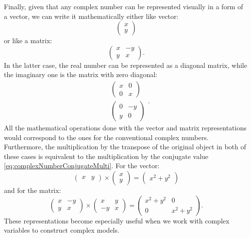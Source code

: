 \documentclass[
]{book}
\begin{document}
Finally, given that any complex number can be represented visually in a form of a vector, we can write it mathematically either like vector:
\begin{equation}
    \begin{pmatrix} x \\ y \end{pmatrix}
    \label{eq:complexNumberVectors}
\end{equation}
or like a matrix:
\begin{equation}
    \begin{pmatrix} x & -y \\ y & x \end{pmatrix} .
    \label{eq:complexNumberMatrix}
\end{equation}
In the latter case, the real number can be represented as a diagonal matrix, while the imaginary one is the matrix with zero diagonal:
\begin{equation*}
    \begin{aligned}
        & \begin{pmatrix} x & 0 \\ 0 & x \end{pmatrix} \\
        & \begin{pmatrix} 0 & -y \\ y & 0 \end{pmatrix}
    \end{aligned} .
\end{equation*}
All the mathematical operations done with the vector and matrix representations would correspond to the ones for the conventional complex numbers. Furthermore, the multiplication by the transpose of the original object in both of these cases is equivalent to the multiplication by the conjugate value \eqref{eq:complexNumberConjugateMulti}. For the vector:
\begin{equation}
    \begin{pmatrix} x & y \end{pmatrix} \times \begin{pmatrix} x \\ y \end{pmatrix} = \begin{pmatrix} x^2 + y^2 \end{pmatrix}
    \label{eq:complexNumberVectorsMulti}
\end{equation}
and for the matrix:
\begin{equation}
    \begin{pmatrix} x & -y \\ y & x \end{pmatrix} \times \begin{pmatrix} x & y \\ -y & x \end{pmatrix} = 
    \begin{pmatrix} x^2 + y^2 & 0 \\ 0 & x^2 + y^2 \end{pmatrix}.
    \label{eq:complexNumberMatrixMulti}
\end{equation}
These representations become especially useful when we work with complex variables to construct complex models.
\end{document}
